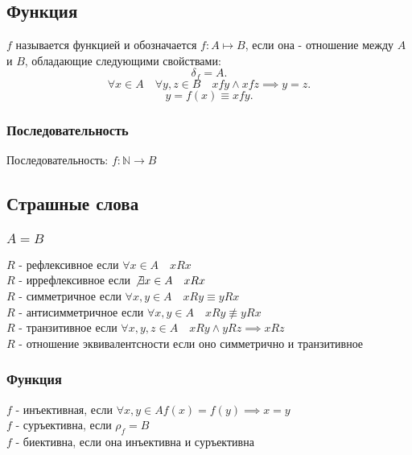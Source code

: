 \documentclass[11pt, oneside]{article}   	%
\begin{document}
    \subsection{Функция}
    $f$ называется функцией и обозначается  $f: A \mapsto B$, если она - отношение между $A$ и  $B$, обладающие следующими свойствами:
         \[ \delta_f = A .\]
         \[ \forall{x \in A}\quad\forall{y, z \in B}\quad xfy\land xfz \implies y=z .\]
         \[ y=f(x) \equiv xfy .\]
         \subsubsection{Последовательность}
         Последовательность: $f : \mathbb{N} \to B$ 

    \subsection{Страшные слова}
        \subsubsection{$A = B$}
            $R$ - рефлексивное если  $\forall{x \in A}\quad xRx$\\ 
            $R$ -  иррефлексивное если $\not\exists{x \in A}\quad xRx$\\
            $R$ - симметричное если  $\forall{x, y \in A}\quad xRy \equiv yRx$\\
            $R$ - антисимметричное если  $\forall{x, y \in A}\quad xRy \not\equiv yRx$ \\
            $R$ - транзитивное если $\forall{x, y, z \in A}\quad xRy\land yRz \implies xRz$\\
            $R$ - отношение эквивалентсности если оно симметрично и транзитивное\\
        \subsubsection{Функция}
            $f$ - инъективная, если  $\forall{x, y \in A} f(x) = f(y) \implies x = y$\\ 
            $f$ - суръективна, если  $\rho_f = B$\\
            $f$ - биективна, если она инъективна и суръективна
\end{document}
